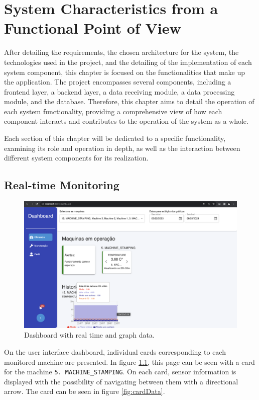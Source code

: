 \chapter{System Characteristics from a Functional Point of View}\label{cap:functions}

After detailing the requirements, the chosen architecture for the system, the technologies used in the project, and the detailing of the implementation of each system component, this chapter is focused on the functionalities that make up the application. The project encompasses several components, including a frontend layer, a backend layer, a data receiving module, a data processing module, and the database. Therefore, this chapter aims to detail the operation of each system functionality, providing a comprehensive view of how each component interacts and contributes to the operation of the system as a whole.

Each section of this chapter will be dedicated to a specific functionality, examining its role and operation in depth, as well as the interaction between different system components for its realization.


\section[Real-time Monitoring]{Real-time Monitoring}\label{sec:realtimeMonitoring}

\begin{figure}[htbp]
	\centering
	\includegraphics[scale=0.22]{images/dashboard.png}
	\caption{Dashboard with real time and graph data.}
	\label{fig:dashboradPage}
\end{figure}

On the user interface dashboard, individual cards corresponding to each monitored machine are presented. In figure \ref{fig:dashboradPage}, this page can be seen with a card for the machine \texttt{5. MACHINE\_STAMPING}. On each card, sensor information is displayed with the possibility of navigating between them with a directional arrow. The card can be seen in figure \ref{fig:cardData}.

